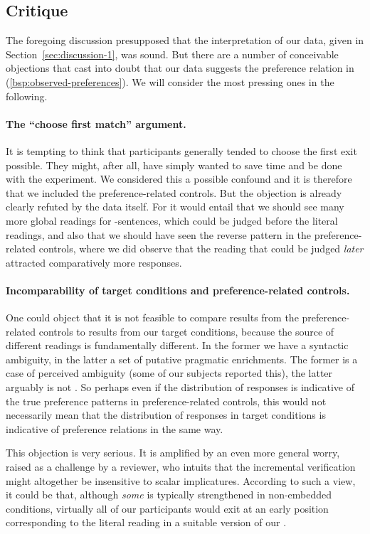\documentclass[fleqn,reqno,10pt]{article}
\renewcommand{\es}{\acro{es}}
\newcommand{\ivt}{\acro{ivt}}
\begin{document}
\subsection{Critique}

The foregoing discussion presupposed that the interpretation of our
data, given in Section~\ref{sec:discussion-1}, was sound. But there
are a number of conceivable objections that cast into doubt that our
data suggests the preference relation in
(\ref{bsp:observed-preferences}). We will consider the most pressing
ones in the following.

\paragraph{The ``choose first match'' argument.} It is tempting to
think that participants generally tended to choose the first exit
possible. They might, after all, have simply wanted to save time and
be done with the experiment. We considered this a possible confound
and it is therefore that we included the preference-related
controls. But the objection is already clearly refuted by the data
itself. For it would entail that we should see many more global
readings for \es-sentences, which could be judged before the literal
readings, and also that we should have seen the reverse pattern in the
preference-related controls, where we did observe that the reading
that could be judged \emph{later} attracted comparatively more
responses. 

\paragraph{Incomparability of target conditions and preference-related
  controls.} One could object that it is not feasible to compare
results from the preference-related controls to results from our
target conditions, because the source of different readings is
fundamentally different. In the former we have a syntactic ambiguity,
in the latter a set of putative pragmatic enrichments. The former is a
case of perceived ambiguity (some of our subjects reported this), the
latter arguably is not
\citep[see][]{GeurtsPouscoulous2009:Embedded-Implic}. So perhaps even
if the distribution of responses is indicative of the true preference
patterns in preference-related controls, this would not necessarily
mean that the distribution of responses in target conditions is
indicative of preference relations in the same way.

This objection is very serious. It is amplified by an even more
general worry, raised as a challenge by a reviewer, who intuits that
the incremental verification might altogether be insensitive to scalar
implicatures. According to such a view, it could be that, although
\emph{some} is typically strengthened in non-embedded conditions,
virtually all of our participants would exit at an early position
corresponding to the literal reading in a suitable version of our
\ivt.
\end{document}
